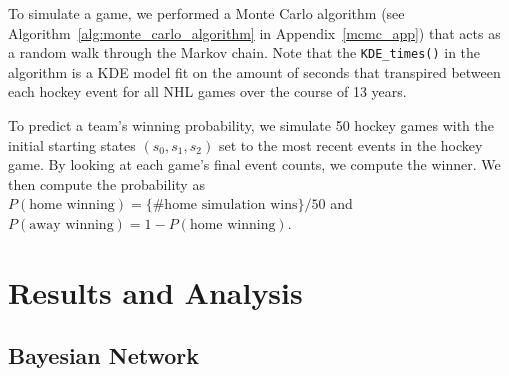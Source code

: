 \documentclass[11pt]{article}
\begin{document}
To simulate a game, we performed a Monte Carlo algorithm (see Algorithm~\ref{alg:monte_carlo_algorithm} in Appendix~\ref{mcmc_app})
that acts as a random walk through the Markov chain. Note that the {\tt KDE\_times()} in the algorithm is a KDE model fit on the amount of seconds that transpired between 
each hockey event for all NHL games over the course of 13 years.

            


To predict a team's winning probability, we simulate 50 hockey games with the initial starting states 
$(s_0, s_1, s_2)$ set to the most recent events in the hockey game. By looking at each game's final event counts, we compute the winner. We then compute the 
probability as $P(\text{home winning}) = \{\text{\# home simulation wins}\}/50$ and 
$P(\text{away winning}) = 1-P(\text{home winning})$.

\section{Results and Analysis}

\subsection{Bayesian Network}
\end{document}
